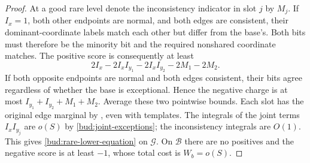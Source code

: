 \begin{proof}
At a good rare level denote the inconsistency indicator in slot
$j$ by $M_j$.  If $I_x=1$, both other endpoints are normal, and
both edges are consistent, their dominant-coordinate labels
match each other but differ from the base's.  Both bits must
therefore be the minority bit and the required nonshared
coordinate matches.  The positive score is consequently at least
\[
 2I_x-2I_x I_{y_1}-2I_x I_{y_2}-2M_1-2M_2.
\]
If both opposite endpoints are normal and both edges consistent,
their bits agree regardless of whether the base is exceptional.
Hence the negative charge is at most
$I_{y_1}+I_{y_2}+M_1+M_2$.
Average these two pointwise bounds.  Each slot has the original
edge marginal by , even with templates.
The integrals of the joint terms $I_xI_{y_j}$ are $o(S)$ by
\eqref{bud:joint-exceptions}; the inconsistency integrals are
$O(1)$.  This gives \eqref{bud:rare-lower-equation} on
$\mathcal G$.  On $\mathcal B$ there are no positives and the
negative score is at least $-1$, whose total cost is
$W_b=o(S)$.
\end{proof}
